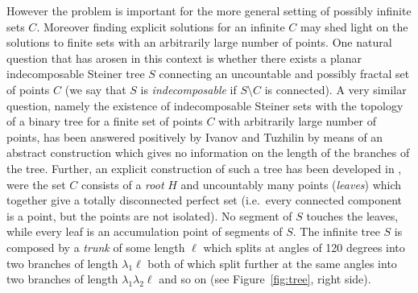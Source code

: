 \documentclass{amsart}
\theoremstyle{definition}
\theoremstyle{remark}
\begin{document}
However the problem is important for the more general setting of possibly infinite 
sets $C$. 
Moreover finding explicit solutions for an infinite $C$ may shed light on 
the solutions to finite sets with an arbitrarily large number of points.
One natural question that has arosen in this context is 
whether there exists a planar indecomposable Steiner tree $S$ connecting an uncountable 
and possibly fractal set of points $C$ 
(we say that $S$ is \emph{indecomposable} if $S\setminus C$ is 
connected).
A very similar question,
namely the existence of indecomposable Steiner sets with the topology 
of a binary tree for a finite set of points $C$ with arbitrarily 
large number of points, has been answered positively by Ivanov and 
Tuzhilin \cite{IvaTuz94} by means of an abstract construction
which gives no information on the length of the branches of the tree.
Further, an explicit construction of such a tree has been developed
in \cite{PaoSteTep15}, were the set $C$ consists of a \emph{root} $H$ and uncountably many
points (\emph{leaves}) which together give a totally disconnected perfect set 
(i.e.\ every connected component is a point, but the points are not isolated).
No segment of $S$
touches the leaves, while every leaf is an accumulation point of
segments of $S$.
The infinite tree $S$ 
is composed by a \emph{trunk} of
some length $\ell$ which splits at angles of 120 degrees 
into two branches of length $\lambda_1 \ell$ 
both of which split further at the same angles into two branches of length
$\lambda_1\lambda_2\ell$ and so on (see Figure~\ref{fig:tree}, right side).
\end{document}
